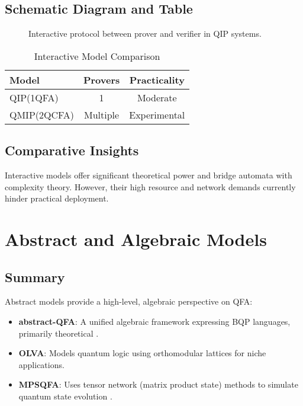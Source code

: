 \subsection{Schematic Diagram and Table}
\begin{figure}[ht]
\centering
{}
\caption{Interactive protocol between prover and verifier in QIP systems.}
\label{fig:interactive}
\end{figure}

\begin{table}[ht]
\centering
\caption{Interactive Model Comparison}
\label{tab:interactive}
\begin{tabular}{|l|c|c|}
\hline
\textbf{Model} & \textbf{Provers} & \textbf{Practicality} \\ \hline
QIP(1QFA) & 1 & Moderate \\ \hline
QMIP(2QCFA) & Multiple & Experimental \\ \hline
\end{tabular}
\end{table}

\subsection{Comparative Insights}
Interactive models offer significant theoretical power and bridge automata with complexity theory. However, their high resource and network demands currently hinder practical deployment.

\section{Abstract and Algebraic Models}

\subsection{Summary}
Abstract models provide a high-level, algebraic perspective on QFA:
\begin{itemize}
    \item \textbf{abstract-QFA}: A unified algebraic framework expressing BQP languages, primarily theoretical \cite{manin1980computable}.
    \item \textbf{OLVA}: Models quantum logic using orthomodular lattices for niche applications.
    \item \textbf{MPSQFA}: Uses tensor network (matrix product state) methods to simulate quantum state evolution \cite{vidal2003efficient}.
\end{itemize}

